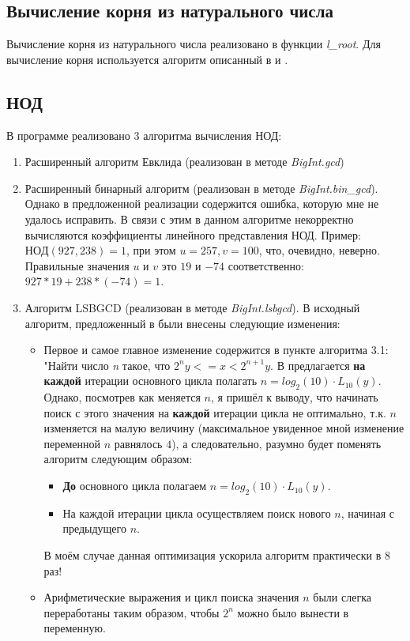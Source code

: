 \subsection{Вычисление корня из натурального числа}
Вычисление корня из натурального числа реализовано в функции \textit{l\_root}. Для вычисление корня используется алгоритм описанный в \cite{zavg} и \cite{nth-root}.

\subsection{НОД}
В программе реализовано 3 алгоритма вычисления НОД:

\begin{enumerate}
    \item Расширенный алгоритм Евклида \cite{zavg} (реализован в методе \textit{BigInt.gcd})
    \item Расширенный бинарный алгоритм \cite{zavg} (реализован в методе \textit{BigInt.bin\_gcd}).
    Однако в предложенной реализации содержится ошибка, которую мне не удалось исправить. В связи с этим в данном алгоритме некорректно вычисляются коэффициенты линейного представления НОД.
    Пример: $НОД(927, 238) = 1$, при этом $u = 257, v = 100$, что, очевидно, неверно. Правильные значения $u$ и $v$ это $19$ и $-74$ соответственно: $927 * 19 + 238 * (-74) = 1$.
    \item Алгоритм LSBGCD \cite{zavg} (реализован в методе \textit{BigInt.lsbgcd}). В исходный алгоритм, предложенный в \cite{zavg} были внесены следующие изменения:
    \begin{itemize}
        \item Первое и самое главное изменение содержится в пункте алгоритма 3.1: "Найти число \textit{n} такое, что $2^n y <= x < 2^{n+1}y$.
        В \cite{zavg} предлагается \textbf{на каждой} итерации основного цикла полагать $n = log_2(10) \cdot L_{10}(y)$. Однако, посмотрев как меняется $n$, я пришёл к выводу, что начинать
        поиск с этого значения на \textbf{каждой} итерации цикла не оптимально, т.к. $n$ изменяется на малую величину (максимальное увиденное мной изменение переменной $n$ равнялось $4$),
        а следовательно, разумно будет поменять алгоритм следующим образом:
        \begin{itemize}
                \item \textbf{До} основного цикла полагаем $n = log_2(10) \cdot L_{10}(y)$.
                \item На каждой итерации цикла осуществляем поиск нового $n$, начиная с предыдущего $n$.
        \end{itemize}
        В моём случае данная оптимизация ускорила алгоритм практически в 8 раз!
        \item Арифметические выражения и цикл поиска значения $n$ были слегка переработаны таким образом, чтобы $2^n$ можно было вынести в переменную.
    \end{itemize}
\end{enumerate}

